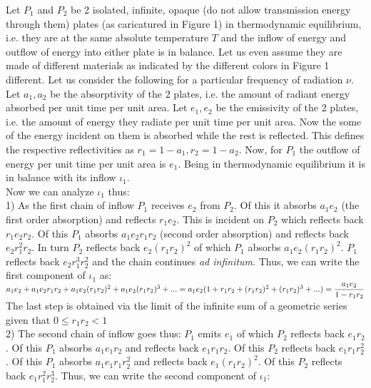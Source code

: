 \documentclass[11pt]{article} %
\numberwithin{equation}{section}
\begin{document}
Let $P_1$ and $P_2$ be 2 isolated, infinite, opaque (do not allow transmission energy through them) plates (as caricatured in Figure 1) in thermodynamic equilibrium, i.e. they are at the same absolute temperature $T$ and the inflow of energy and outflow of energy into either plate is in balance. Let us even assume they are made of different materials as indicated by the different colors in Figure 1 different. Let us consider the following for a particular frequency of radiation $\nu$.  Let $a_1, a_2$ be the absorptivity of the 2 plates, i.e. the amount of radiant energy absorbed per unit time per unit area. Let $e_1, e_2$ be the emissivity of the 2 plates, i.e. the amount of energy they radiate per unit time per unit area. Now the some of the energy incident on them is absorbed while the rest is reflected. This defines the respective reflectivities as $r_1=1-a_1, r_2=1-a_2$. Now, for $P_1$ the outflow of energy per unit time per unit area is $e_1$. Being in thermodynamic equilibrium it is in balance with its inflow $\iota_1$.\\ 

Now we can analyze $\iota_1$ thus:\\ 
1) As the first chain of inflow $P_1$ receives $e_2$ from $P_2$. Of this it absorbs $a_1 e_2$ (the first order absorption) and reflects $r_1 e_2$. This is incident on $P_2$ which reflects back $r_1 e_2 r_2$. Of this $P_1$ absorbs $a_1 e_2 r_1 r_2$ (second order absorption) and reflects back $e_2 r_1^2 r_2$. In turn $P_2$ reflects back $e_2 (r_1 r_2)^2$ of which $P_1$ absorbs $a_1 e_2 (r_1 r_2)^2$. $P_1$ reflects back $e_2 r_1^3r_2^2$ and the chain continues \textit{ad infinitum}. Thus, we can write the first component of $\iota_1$ as:\\

 $a_1 e_2+a_1 e_2 r_1 r_2+ a_1 e_2 (r_1 r_2)^2+a_1 e_2 (r_1 r_2)^3+...\\[5pt]
 =a_1 e_2(1+r_1 r_2+ (r_1 r_2)^2+(r_1 r_2)^3+...)\\[5pt]
 =\dfrac{a_1 e_2}{1-r_1 r_2}$\\

The last step is obtained via the limit of the infinite sum of a geometric series given that $0 \le r_1 r_2<1$\\

2) The second chain of inflow goes thus: $P_1$ emits $e_1$ of which $P_2$ reflects back $e_1 r_2$. Of this $P_1$ absorbs $a_1 e_1 r_2$ and reflects back $e_1 r_1 r_2$. Of this $P_2$ reflects back $e_1 r_1 r_2^2$. Of this $P_1$ absorbs $a_1 e_1 r_1 r_2^2$ and reflects back $e_1 (r_1 r_2)^2$. Of this $P_2$ reflects back $e_1 r_1^2 r_2^3$. Thus, we can write the second component of $\iota_1$:\\
\end{document}
